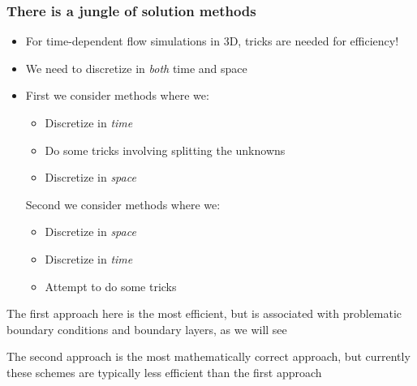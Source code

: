 \begin{frame}
  \frametitle{There is a jungle of solution methods}

\begin{itemize}
\item For time-dependent flow simulations in 3D, tricks are needed for efficiency! 
\item We need to discretize in \emph{both} time and space 
\item First we consider methods where we: 
\begin{itemize}
\item Discretize in \emph{time} 
\item Do some tricks involving splitting the unknowns  
\item Discretize in \emph{space} 
\end{itemize}
Second we consider methods where we: 
\begin{itemize}
\item Discretize in \emph{space} 
\item Discretize in \emph{time} 
\item Attempt to do some tricks 
\end{itemize}
\end{itemize}
The first approach here is the most efficient, but is associated with 
problematic boundary conditions and boundary layers, as we will see 

\vspace{0.3cm}
The second approach is the most mathematically correct approach, but 
currently these schemes are typically less efficient than the first
approach 

\end{frame}

